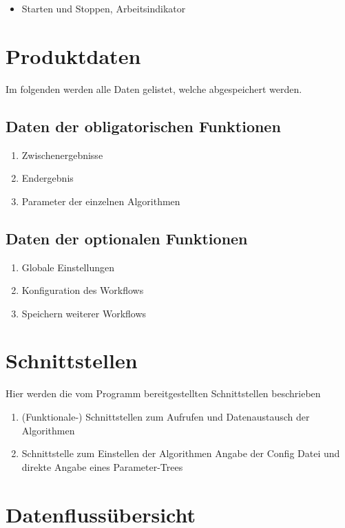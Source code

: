 \begin{itemize}
\item Starten und Stoppen, Arbeitsindikator 
\end{itemize}

\newpage
\section{Produktdaten}
Im folgenden werden alle Daten gelistet, welche abgespeichert werden.
\subsection{Daten der obligatorischen Funktionen}
\begin{enumerate}[align=left,leftmargin=4em, label={\textbf{\textbackslash PD10\arabic*0\textbackslash}} ]
	\item Zwischenergebnisse
	\item Endergebnis
	\item Parameter der einzelnen Algorithmen
\end{enumerate}
\subsection{Daten der optionalen Funktionen}
\begin{enumerate}[align=left,leftmargin=4em, label={\textbf{\textbackslash PD20\arabic*0\textbackslash}} ]
	\item Globale Einstellungen
	\item Konfiguration des Workflows
	\item Speichern weiterer Workflows
\end{enumerate}	

\section{Schnittstellen}
Hier werden die vom Programm bereitgestellten Schnittstellen beschrieben
\begin{enumerate}[ align=left, label={\textbf{\textbackslash S1\arabic*0\textbackslash}}]
\item (Funktionale-) Schnittstellen zum Aufrufen und Datenaustausch der Algorithmen
\item  Schnittstelle zum Einstellen der Algorithmen
Angabe der Config Datei und direkte Angabe eines Parameter-Trees
\end{enumerate}
\newpage 
\section{Datenflussübersicht}

